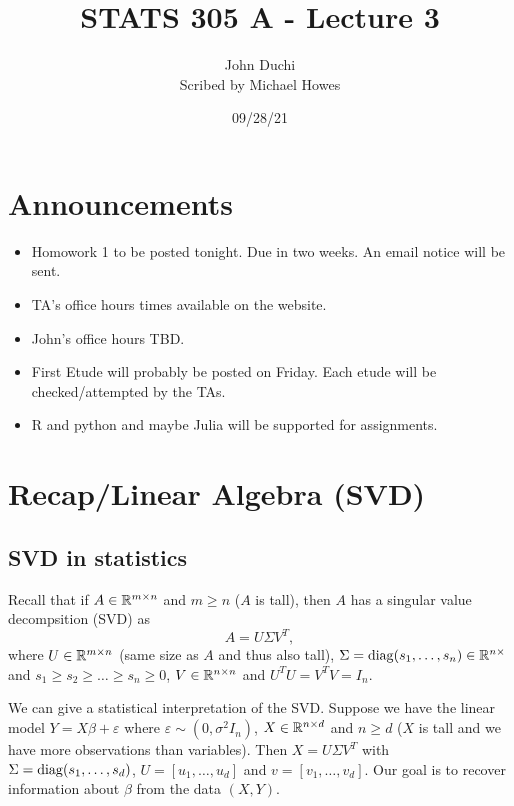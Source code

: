 




\title{STATS 305 A - Lecture 3}
\author{John Duchi\\ Scribed by Michael Howes}
\date{09/28/21}

\pagestyle{fancy}
\fancyhf{}


\maketitle
\tableofcontents

\section{Announcements}
\begin{itemize}
    \item Homowork 1 to be posted tonight. Due in two weeks. An email notice will be sent.
    \item TA's office hours times available on the website.
    \item John's office hours TBD.
    \item First Etude will probably be posted on Friday. Each etude will be checked/attempted by the TAs.
    \item R and python and maybe Julia will be supported for assignments.
\end{itemize}

\section{Recap/Linear Algebra (SVD)}
\subsection{SVD in statistics}
Recall that if $A \in {\mathbb R}^{m \times n}$ and $m \ge n$ ($A$ is tall), then $A$ has a singular value decompsition (SVD) as 
\[A = U\Sigma V^T, \]
where $U \in {\mathbb R}^{m \times n}$ (same size as $A$ and thus also tall), $\Sigma = \operatorname*{diag}(s_1,\ldots,s_n) \in {\mathbb R}^{n \times}$ and $s_1 \ge s_2 \ge \ldots \ge s_n \ge 0$, $V \in {\mathbb R}^{n \times n}$ and $U^TU = V^TV = I_n$.

We can give a statistical interpretation of the SVD. Suppose we have the linear model $Y = X\beta+\varepsilon$ where $\varepsilon \sim (0,\sigma^2I_n)$, $X \in {\mathbb R}^{n \times d}$ and $n \ge d$ ($X$ is tall and we have more observations than variables). Then $X = U\Sigma V^T$ with $\Sigma = \operatorname*{diag}(s_1,\ldots, s_d)$, $U= [u_1,\ldots, u_d]$ and $v = [v_1,\ldots,v_d]$. Our goal is to recover information about $\beta$ from the data $(X,Y)$.

